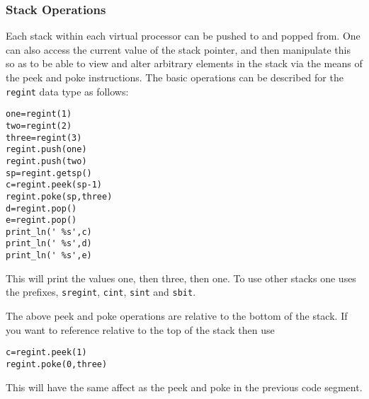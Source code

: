 \subsubsection{Stack Operations}
Each stack within each virtual processor can be pushed to and popped from.
One can also access the current value of the stack pointer, and then
manipulate this so as to be able to view and alter arbitrary elements
in the stack via the means of the peek and poke instructions.
The basic operations can be described for the \verb+regint+ data type
as follows:
\begin{lstlisting}
one=regint(1)
two=regint(2)
three=regint(3)
regint.push(one)
regint.push(two)
sp=regint.getsp()
c=regint.peek(sp-1)
regint.poke(sp,three)
d=regint.pop()
e=regint.pop()
print_ln(' %s',c)
print_ln(' %s',d)
print_ln(' %s',e)
\end{lstlisting}
This will print the values one, then three, then one.
To use other stacks one uses the prefixes, \verb+sregint+, \verb+cint+,
\verb+sint+ and \verb+sbit+.

The above peek and poke operations are relative to the bottom
of the stack. If you want to reference relative to the top
of the stack then use
\begin{lstlisting}
c=regint.peek(1)
regint.poke(0,three)
\end{lstlisting}
This will have the same affect as the peek and poke in the previous
code segment.

